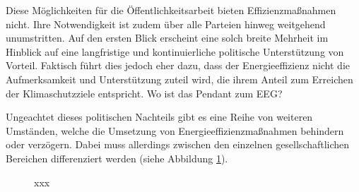Diese Möglichkeiten für die Öffentlichkeitsarbeit bieten Effizienzmaßnahmen nicht. Ihre Notwendigkeit ist zudem über alle Parteien hinweg weitgehend unumstritten. Auf den ersten Blick erscheint eine solch breite Mehrheit im Hinblick auf eine langfristige und kontinuierliche politische Unterstützung von Vorteil. Faktisch führt dies jedoch eher dazu, dass der Energieeffizienz nicht die Aufmerksamkeit und Unterstützung zuteil wird, die ihrem Anteil zum Erreichen der Klimaschutzziele entspricht. Wo ist das Pendant zum EEG?

Ungeachtet dieses politischen Nachteils gibt es eine Reihe von weiteren Umständen, welche die Umsetzung von Energieeffizienzmaßnahmen behindern oder verzögern. Dabei muss allerdings zwischen den einzelnen gesellschaftlichen Bereichen differenziert werden (siehe Abbildung \ref{fig:2}).\\

\begin{figure}[h]
	\centering
		\missingfigure{}			%
	\caption{xxx}
	\label{fig:2}
\end{figure}
